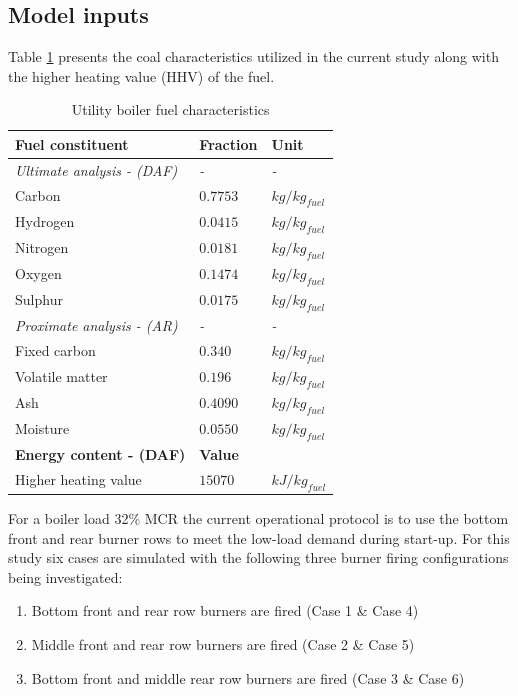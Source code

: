 \documentclass[review]{elsarticle}
\begin{document}
\subsection{Model inputs}
Table \ref{tbl_fuel} presents the coal characteristics utilized in the current study along with the higher heating value (HHV) of the fuel.\\
\begin{table}[h!]
\centering
\caption{Utility boiler fuel characteristics}
\vspace{2mm}
\label{tbl_fuel}
{\tabulinesep=1.2mm
\begin{tabularx}{\textwidth}{p{} p{} l}
\hline
\textbf{Fuel constituent} & \textbf{Fraction} & \textbf{Unit}\\
\hline
\textit{Ultimate analysis - (DAF)} & \textit{-} & \textit{-}\\
Carbon & $0.7753$ & $kg/kg_{fuel}$\\
Hydrogen & $0.0415$ & $kg/kg_{fuel}$\\
Nitrogen & $0.0181$ & $kg/kg_{fuel}$\\
Oxygen & $0.1474$ & $kg/kg_{fuel}$\\
Sulphur & $0.0175$ & $kg/kg_{fuel}$\\
\textit{Proximate analysis - (AR)} & \textit{-} & \textit{-}\\
Fixed carbon & $0.340$ & $kg/kg_{fuel}$\\
Volatile matter & $0.196$ & $kg/kg_{fuel}$\\
Ash & $0.4090$ & $kg/kg_{fuel}$\\
Moisture & $0.0550$ & $kg/kg_{fuel}$\\
\hline
\textbf{Energy content - (DAF)} & \textbf{Value} &\\
\hline
Higher heating value & $15070$ & $kJ/kg_{fuel}$\\
\hline
\end{tabularx}}
\end{table}

For a boiler load 32\% MCR the current operational protocol is to use the bottom front and rear burner rows to meet the low-load demand during start-up.  For this study six cases are simulated with the following three burner firing configurations being investigated:
\begin{enumerate}
\item Bottom front and rear row burners are fired (Case 1 \& Case 4)
\item Middle front and rear row burners are fired (Case 2 \& Case 5)
\item Bottom front and middle rear row burners are fired (Case 3 \& Case 6)
\end{enumerate}
\end{document}
